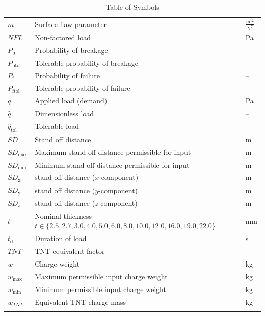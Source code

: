 \documentclass[12pt]{article}
\begin{document}
\begin{longtabu}{l X[l] l}
\\
$m$ & Surface flaw parameter & $\frac{\text{m}^{12}}{\text{N}^{7}}$
\\
$NFL$ & Non-factored load & Pa
\\
${P_{\text{b}}}$ & Probability of breakage & --
\\
${P_{\text{b}\text{tol}}}$ & Tolerable probability of breakage & --
\\
${P_{\text{f}}}$ & Probability of failure & --
\\
${P_{\text{f}\text{tol}}}$ & Tolerable probability of failure & --
\\
$q$ & Applied load (demand) & Pa
\\
$\hat{q}$ & Dimensionless load & --
\\
${\hat{q}_{\text{tol}}}$ & Tolerable load & --
\\
$SD$ & Stand off distance & m
\\
${SD_{\text{max}}}$ & Maximum stand off distance permissible for input & m
\\
${SD_{\text{min}}}$ & Minimum stand off distance permissible for input & m
\\
${SD_{\text{x}}}$ & stand off distance ($x$-component) & m
\\
${SD_{\text{y}}}$ & stand off distance ($y$-component) & m
\\
${SD_{\text{z}}}$ & stand off distance ($z$-component) & m
\\
$t$ & Nominal thickness $t\in{}\{2.5,2.7,3.0,4.0,5.0,6.0,8.0,10.0,12.0,16.0,19.0,22.0\}$ & mm
\\
${t_{\text{d}}}$ & Duration of load & s
\\
$TNT$ & TNT equivalent factor & --
\\
$w$ & Charge weight & kg
\\
${w_{\text{max}}}$ & Maximum permissible input charge weight & kg
\\
${w_{\text{min}}}$ & Minimum permissible input charge weight & kg
\\
${w_{TNT}}$ & Equivalent TNT charge mass & kg
\\
\bottomrule
\caption{Table of Symbols}
\label{Table:ToS}
\end{longtabu}
\end{document}
